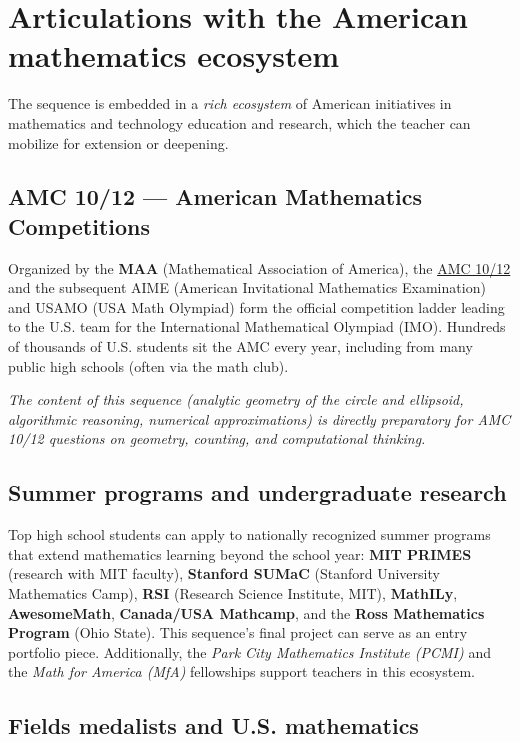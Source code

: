 \documentclass[12pt,a4paper]{scrartcl}
\newcommand{\acc}[1]{\textcolor{accent}{\textbf{#1}}}
\begin{document}
\section{Articulations with the American mathematics ecosystem}\label{sec:olympiad}

The sequence is embedded in a \emph{rich ecosystem} of American initiatives in mathematics and technology education and research, which the teacher can mobilize for extension or deepening.

\subsection{AMC 10/12 --- American Mathematics Competitions}

Organized by the \acc{MAA} (Mathematical Association of America), the \href{https://www.maa.org/math-competitions}{AMC 10/12} and the subsequent AIME (American Invitational Mathematics Examination) and USAMO (USA Math Olympiad) form the official competition ladder leading to the U.S. team for the International Mathematical Olympiad (IMO). Hundreds of thousands of U.S. students sit the AMC every year, including from many public high schools (often via the math club).

\emph{The content of this sequence (analytic geometry of the circle and ellipsoid, algorithmic reasoning, numerical approximations) is directly preparatory for AMC 10/12 questions on geometry, counting, and computational thinking.}

\subsection{Summer programs and undergraduate research}

Top high school students can apply to nationally recognized summer programs that extend mathematics learning beyond the school year: \acc{MIT PRIMES} (research with MIT faculty), \acc{Stanford SUMaC} (Stanford University Mathematics Camp), \acc{RSI} (Research Science Institute, MIT), \acc{MathILy}, \acc{AwesomeMath}, \acc{Canada/USA Mathcamp}, and the \acc{Ross Mathematics Program} (Ohio State). This sequence's final project can serve as an entry portfolio piece. Additionally, the \emph{Park City Mathematics Institute (PCMI)} and the \emph{Math for America (MfA)} fellowships support teachers in this ecosystem.

\subsection{Fields medalists and U.S. mathematics}
\end{document}

